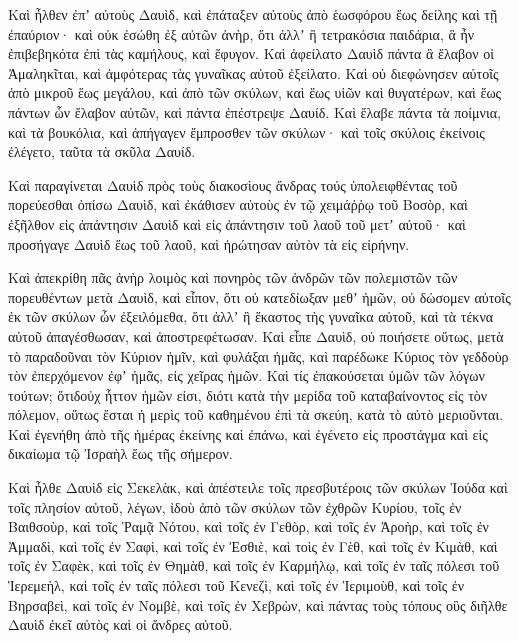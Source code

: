 {Καὶ ἦλθεν ἐπʼ αὐτοὺς Δαυὶδ, καὶ ἐπάταξεν αὐτοὺς ἀπὸ ἑωσφόρου ἕως δείλης καὶ τῇ ἐπαύριον· καὶ οὐκ ἐσώθη ἐξ αὐτῶν ἀνὴρ, ὅτι ἀλλʼ ἢ τετρακόσια παιδάρια, ἃ ἦν ἐπιβεβηκότα ἐπὶ τὰς καμήλους, καὶ ἔφυγον.
Καὶ ἀφείλατο Δαυὶδ πάντα ἃ ἔλαβον οἱ Ἀμαληκῖται, καὶ ἀμφότερας τὰς γυναῖκας αὐτοῦ ἐξείλατο.
Καὶ οὐ διεφώνησεν αὐτοῖς ἀπὸ μικροῦ ἕως μεγάλου, καὶ ἀπὸ τῶν σκύλων, καὶ ἕως υἱῶν καὶ θυγατέρων, καὶ ἕως πάντων ὧν ἔλαβον αὐτῶν, καὶ πάντα ἐπέστρεψε Δαυίδ.
Καὶ ἔλαβε πάντα τὰ ποίμνια, καὶ τὰ βουκόλια, καὶ ἀπήγαγεν ἔμπροσθεν τῶν σκύλων· καὶ τοῖς σκύλοις ἐκείνοις ἐλέγετο, ταῦτα τὰ σκῦλα Δαυίδ.
\par }{\PP {}Καὶ παραγίνεται Δαυὶδ πρὸς τοὺς διακοσὶους ἄνδρας τούς ὑπολειφθέντας τοῦ πορεύεσθαι ὀπίσω Δαυὶδ, καὶ ἐκάθισεν αὐτοὺς ἐν τῷ χειμάῤῥῳ τοῦ Βοσὸρ, καὶ ἐξῆλθον εἰς ἀπάντησιν Δαυὶδ καὶ εἰς ἀπάντησιν τοῦ λαοῦ τοῦ μετʼ αὐτοῦ· καὶ προσήγαγε Δαυὶδ ἕως τοῦ λαοῦ, καὶ ἠρώτησαν αὐτὸν τὰ εἰς εἰρήνην.
\par }{\PP {}Καὶ ἀπεκρίθη πᾶς ἀνὴρ λοιμὸς καὶ πονηρὸς τῶν ἀνδρῶν τῶν πολεμιστῶν τῶν πορευθέντων μετὰ Δαυὶδ, καὶ εἶπον, ὅτι οὐ κατεδίωξαν μεθʼ ἡμῶν, οὐ δώσομεν αὐτοῖς ἐκ τῶν σκύλων ὧν ἐξειλόμεθα, ὅτι ἀλλʼ ἢ ἕκαστος τὴς γυναῖκα αὐτοῦ, καὶ τὰ τέκνα αὐτοῦ ἀπαγέσθωσαν, καὶ ἀποστρεφέτωσαν.
Καὶ εἶπε Δαυὶδ, οὐ ποιήσετε οὕτως, μετὰ τὸ παραδοῦναι τὸν Κύριον ἡμῖν, καὶ φυλάξαι ἡμᾶς, καὶ παρέδωκε Κύριος τὸν γεδδοὺρ τὸν ἐπερχόμενον ἐφʼ ἡμᾶς, εἰς χεῖρας ἡμῶν.
Καὶ τίς ἐπακούσεται ὑμῶν τῶν λόγων τούτων; ὅτιδοὐχ ἧττον ἡμῶν εἰσι, διότι κατὰ τὴν μερίδα τοῦ καταβαίνοντος εἰς τὸν πόλεμον, οὕτως ἔσται ἡ μερὶς τοῦ καθημένου ἐπὶ τὰ σκεύη, κατὰ τὸ αὐτὸ μεριοῦνται.
Καὶ ἐγενήθη ἀπὸ τῆς ἡμέρας ἐκείνης καὶ ἐπάνω, καὶ ἐγένετο εἰς προστάγμα καὶ εἱς δικαίωμα τῷ Ἰσραὴλ ἕως τῆς σήμερον.
\par }{\PP {}Καὶ ἦλθε Δαυὶδ εἰς Σεκελὰκ, καὶ ἀπέστειλε τοῖς πρεσβυτέροις τῶν σκύλων Ἰούδα καὶ τοῖς πλησίον αὐτοῦ, λέγων, ἰδοὺ ἀπὸ τῶν σκύλων τῶν ἐχθρῶν Κυρίου,
τοῖς ἐν Βαιθσοὺρ, καὶ τοῖς Ῥαμᾷ Νότου, καὶ τοῖς ἐν Γεθὸρ,
καὶ τοῖς ἐν Ἀροὴρ, καὶ τοῖς ἐν Ἀμμαδὶ, καὶ τοῖς ἐν Σαφὶ, καὶ τοῖς ἐν Ἐσθιὲ,
καὶ τοὶς ἐν Γὲθ, καὶ τοῖς ἐν Κιμὰθ, καὶ τοῖς ἐν Σαφὲκ, καὶ τοῖς ἐν Θημὰθ,
καὶ τοῖς ἐν Καρμήλῳ, καὶ τοῖς ἐν ταῖς πόλεσι τοῦ Ἱερεμεὴλ, καὶ τοῖς ἐν ταῖς πόλεσι τοῦ Κενεζὶ,
καὶ τοῖς ἐν Ἱεριμοὺθ, καὶ τοῖς ἐν Βηρσαβεὶ, καὶ τοῖς ἐν Νομβὲ,
καὶ τοῖς ἐν Χεβρὼν, καὶ πάντας τοὺς τόπους οὓς διῆλθε Δαυὶδ ἐκεῖ αὐτὸς καὶ οἱ ἄνδρες αὐτοῦ.

}
